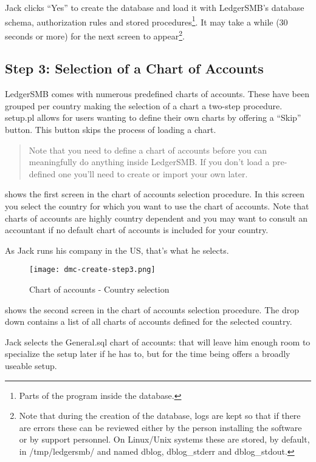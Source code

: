 Jack clicks ``Yes'' to create the database and load it with LedgerSMB's database
schema, authorization rules and stored
procedures\footnote{Parts of the program inside the database.}. It may
take a while (30 seconds or more) for the next screen to appear\footnote{Note 
that during the creation of the database, logs are kept so that if there are
errors these can be reviewed either by the person installing the software or by
support personnel.  On Linux/Unix systems these are stored, by default, in
/tmp/ledgersmb/ and named dblog, dblog\_stderr and dblog\_stdout.}.

\subsection{Step 3: Selection of a Chart of Accounts}
\label{subsec-create-setup-select-coa}

LedgerSMB comes with numerous predefined charts of accounts. These have been grouped
per country making the selection of a chart a two-step procedure. setup.pl allows for
users wanting to define their own charts by offering a ``Skip'' button. This button
skips the process of loading a chart.

\begin{quote}
Note that you need to define a chart of accounts before you can meaningfully do anything
inside LedgerSMB. If you don't load a pre-defined one you'll need to create or import your
own later.
\end{quote}

 shows the first screen in the chart of accounts selection procedure.
In this screen you select the country for which you want to use the chart of accounts. Note
that charts of accounts are highly country dependent and you may want to consult
an accountant if no default chart of accounts is included for your country.

As Jack runs his company in the US, that's what he selects.

\begin{figure}[h]
\centering
\texttt{[image: dmc-create-step3.png]}
\caption{Chart of accounts - Country selection}
\label{fig:setup-step3}
\end{figure}

 shows the second screen in the chart of accounts selection procedure.
The drop down contains a list of all charts of accounts defined for the selected country.

Jack selects the General.sql chart of accounts: that will leave him enough room to specialize
the setup later if he has to, but for the time being offers a broadly useable setup.

